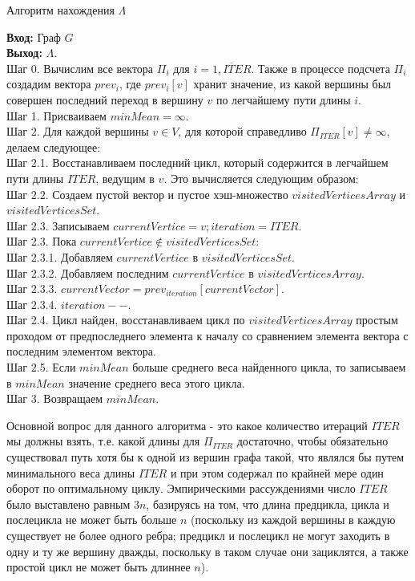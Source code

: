 \documentclass[a4paper,12pt]{report}
\theoremstyle{plain} %
\theoremstyle{definition}
\theoremstyle{remark}
\begin{document}
\begin{large}
\begin{algorithm}[H]
\caption{Алгоритм нахождения $\Lambda$}
\label{diff_graph_construct}
\textbf{Вход:} Граф $G$\\
\textbf{Выход:} $\Lambda$.\\
Шаг 0. Вычислим все вектора $\Pi_i$ для $i = \overline{1, ITER}$. Также в процессе подсчета $\Pi_i$ создадим вектора $prev_i$, где $prev_i[v]$ хранит значение, из какой вершины был совершен последний переход в вершину $v$ по легчайшему пути длины $i$.\\
Шаг 1. Присваиваем $minMean = \infty$.\\
Шаг 2. Для каждой вершины $v \in V$, для которой справедливо $\Pi_{ITER}[v] \ne \infty$, делаем следующее:\\
Шаг 2.1. Восстанавливаем последний цикл, который содержится в легчайшем пути длины $ITER$, ведущим в $v$. Это вычисляется следующим образом:\\
Шаг 2.2. Создаем пустой вектор и пустое хэш-множество $visitedVerticesArray$ и $visitedVerticesSet$.\\
Шаг 2.3. Записываем $currentVertice = v; iteration = ITER$.\\
Шаг 2.3. Пока $currentVertice \notin visitedVerticesSet$:\\
Шаг 2.3.1. Добавляем $currentVertice$ в $visitedVerticesSet$.\\
Шаг 2.3.2. Добавляем последним $currentVertice$ в $visitedVerticesArray$.\\
Шаг 2.3.3. $currentVector = prev_{iteration}[currentVector]$.\\
Шаг 2.3.4. $iteration--$.\\
Шаг 2.4. Цикл найден, восстанавливаем цикл по $visitedVerticesArray$ простым проходом от предпоследнего элемента к началу со сравнением элемента вектора с последним элементом вектора.\\
Шаг 2.5. Если $minMean$ больше среднего веса найденного цикла, то записываем в $minMean$ значение среднего веса этого цикла.\\
Шаг 3. Возвращаем $minMean$.\\ 
\end{algorithm}

Основной вопрос для данного алгоритма - это какое количество итераций $ITER$ мы должны взять, т.е. какой длины для $\Pi_{ITER}$ достаточно, чтобы обязательно существовал путь хотя бы к одной из вершин графа такой, что являлся бы путем минимального веса длины $ITER$ и при этом содержал по крайней мере один оборот по оптимальному циклу. Эмпирическими рассуждениями число $ITER$ было выставлено равным $3n$, базируясь на том, что длина предцикла, цикла и послецикла не может быть больше $n$ (поскольку из каждой вершины в каждую существует не более одного ребра; предцикл и послецикл не могут заходить в одну и ту же вершину дважды, поскольку в таком случае они зациклятся, а также простой цикл не может быть длиннее $n$).


\end{large}
\end{document}
